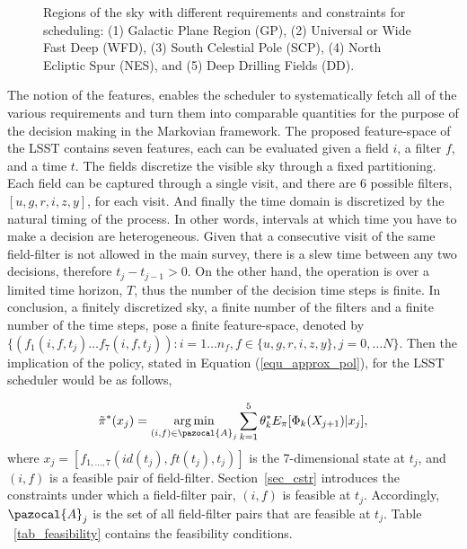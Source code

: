 \documentclass[12pt]{aastex62}
\theoremstyle{definition}
\DeclareMathOperator*{\argmin}{arg\,min}
\begin{document}
\begin{figure}[h!]
\begin{center}
\caption{Regions of the sky with different requirements and constraints for scheduling: (1) Galactic Plane Region (GP), (2) Universal or Wide Fast Deep (WFD), (3) South Celestial Pole (SCP), (4) North Ecliptic Spur (NES), and (5) Deep Drilling Fields (DD).}
\end{center}
\end{figure}\label{fig_proposals}

 The notion of the features, enables the scheduler to systematically fetch all of the various requirements and turn them into comparable quantities for the purpose of the decision making in the Markovian framework. The proposed feature-space of the LSST contains seven features, each can be evaluated given a field $i$, a filter $f$, and a time $t$. The fields discretize the visible sky through a fixed partitioning. Each field can be captured through a single visit, and there are 6 possible filters, $[u,g,r,i,z,y]$, for each visit. And finally the time domain is discretized by the natural timing of the process. In other words, intervals at which time you have to make a decision are heterogeneous. Given that a consecutive visit of the same field-filter is not allowed in the main survey, there is a slew time between any two decisions, therefore $t_{j} - t_{j-1} > 0$. On the other hand, the operation is over a limited time horizon, $T$, thus the number of the decision time steps is finite. In conclusion, a finitely discretized sky, a finite number of the filters and a finite number of the time steps, pose a finite feature-space, denoted by $\{(f_1(i,f,t_j)\dots f_7(i,f,t_j)): i = 1\dots n_f, f\in \{u,g,r,i,z,y\}, j = 0,\dots N\}$. Then the implication of the policy, stated in Equation (\ref{equ_approx_pol}), for the LSST scheduler would be as follows,

\begin{equation}\label{equ_approx_pol_imp}
\tilde{\pi}^*(x_j)= \argmin_{(i,f)\in \pazocal{A}_{j}} \sum_{k=1}^5 \theta^*_k E_{\pi}[\Phi_k(X_{j+1}) | x_j]\\,
\end{equation}
where $x_j = [f_{1, \dots,7}(id(t_j),ft(t_j),t_j)]$ is the 7-dimensional state at $t_j$, and $(i,f)$ is a feasible pair of field-filter. Section~\ref{sec_cstr} introduces the constraints under which a field-filter pair, $(i,f)$ is feasible at $t_{j}$. Accordingly, $\pazocal{A}_j$ is the set of all field-filter pairs that are feasible at $t_j$. Table ~\ref{tab_feasibility} contains the feasibility conditions.
\end{document}

